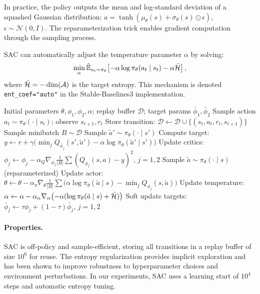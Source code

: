 In practice, the policy outputs the mean and log-standard deviation of a squashed Gaussian distribution: $a = \tanh(\mu_\theta(s) + \sigma_\theta(s) \odot \epsilon)$, $\epsilon \sim \mathcal{N}(0, I)$. The reparameterization trick enables gradient computation through the sampling process.

\begin{remark}
SAC can automatically adjust the temperature parameter $\alpha$ by solving:
\begin{equation}
    \min_\alpha \hat{\mathbb{E}}_{a_t \sim \pi_\theta}\!\left[-\alpha \log \pi_\theta(a_t \mid s_t) - \alpha \bar{\mathcal{H}}\right],
\end{equation}
where $\bar{\mathcal{H}} = -\dim(\mathcal{A})$ is the target entropy. This mechanism is denoted \texttt{ent\_coef="auto"} in the Stable-Baselines3 implementation.
\end{remark}

\begin{algorithm}[htbp]
\caption{Soft Actor-Critic (SAC)}
\label{alg:sac}
\begin{algorithmic}[1]
\Require Initial parameters $\theta, \phi_1, \phi_2, \alpha$; replay buffer $\mathcal{D}$; target params $\bar{\phi}_1, \bar{\phi}_2$
    \State Sample action $a_t \sim \pi_\theta(\cdot \mid s_t)$; observe $s_{t+1}, r_t$
    \State Store transition: $\mathcal{D} \gets \mathcal{D} \cup \{(s_t, a_t, r_t, s_{t+1})\}$
\EndFor
{}
    \State Sample minibatch $B \sim \mathcal{D}$
    \State Sample $\tilde{a}' \sim \pi_\theta(\cdot \mid s')$
    \State Compute target: $y \gets r + \gamma\bigl(\min_j Q_{\bar{\phi}_j}(s', \tilde{a}') - \alpha \log \pi_\theta(\tilde{a}' \mid s')\bigr)$
    \State Update critics: $\phi_j \gets \phi_j - \alpha_Q \nabla_{\phi_j} \frac{1}{|B|} \sum (Q_{\phi_j}(s,a) - y)^2$, \; $j = 1, 2$
    \State Sample $\tilde{a} \sim \pi_\theta(\cdot \mid s)$ (reparameterized)
    \State Update actor: $\theta \gets \theta - \alpha_\pi \nabla_\theta \frac{1}{|B|} \sum \bigl(\alpha \log \pi_\theta(\tilde{a} \mid s) - \min_j Q_{\phi_j}(s, \tilde{a})\bigr)$
    \State Update temperature: $\alpha \gets \alpha - \alpha_\alpha \nabla_\alpha \bigl(-\alpha(\log \pi_\theta(\tilde{a} \mid s) + \bar{\mathcal{H}})\bigr)$
    \State Soft update targets: $\bar{\phi}_j \gets \tau \phi_j + (1{-}\tau) \bar{\phi}_j$, \; $j = 1, 2$
\EndFor
\end{algorithmic}
\end{algorithm}

\paragraph{Properties.} SAC is off-policy and sample-efficient, storing all transitions in a replay buffer of size $10^6$ for reuse. The entropy regularization provides implicit exploration and has been shown to improve robustness to hyperparameter choices and environment perturbations. In our experiments, SAC uses a learning start of $10^4$ steps and automatic entropy tuning.

